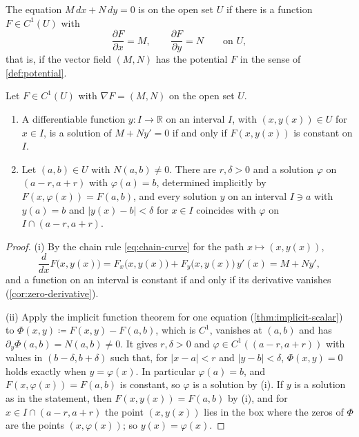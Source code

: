 \begin{definition}
\label{def:exact}
The equation $M\,dx+N\,dy=0$ is  on the open set $U$ if there is a function $F\in C^1(U)$ with
\[
\frac{\partial F}{\partial x}=M,\qquad\frac{\partial F}{\partial y}=N\qquad\text{on }U ,
\]
that is, if the vector field $(M,N)$ has the potential $F$ in the sense of \cref{def:potential}.
\end{definition}

\begin{theorem}
\label{thm:exact-solutions}
Let $F\in C^1(U)$ with $\nabla F=(M,N)$ on the open set $U$.
\begin{enumerate}
\item A differentiable function $y\colon I\to\mathbb R$ on an interval $I$, with $(x,y(x))\in U$ for $x\in I$, is a solution of $M+Ny'=0$ if and only if $F(x,y(x))$ is constant on $I$.
\item Let $(a,b)\in U$ with $N(a,b)\ne0$. There are $r,\delta>0$ and a solution $\varphi$ on $(a-r,a+r)$ with $\varphi(a)=b$, determined implicitly by $F(x,\varphi(x))=F(a,b)$, and every solution $y$ on an interval $I\ni a$ with $y(a)=b$ and $|y(x)-b|<\delta$ for $x\in I$ coincides with $\varphi$ on $I\cap(a-r,a+r)$.
\end{enumerate}
\end{theorem}

\begin{proof}
(i) By the chain rule \eqref{eq:chain-curve} for the path $x\mapsto(x,y(x))$,
\[
\frac d{dx}F\bigl(x,y(x)\bigr)=F_x\bigl(x,y(x)\bigr)+F_y\bigl(x,y(x)\bigr)\,y'(x)=M+Ny' ,
\]
and a function on an interval is constant if and only if its derivative vanishes (\cref{cor:zero-derivative}).

(ii) Apply the implicit function theorem for one equation (\cref{thm:implicit-scalar}) to $\Phi(x,y)\coloneqq F(x,y)-F(a,b)$, which is $C^1$, vanishes at $(a,b)$ and has $\partial_y\Phi(a,b)=N(a,b)\ne0$. It gives $r,\delta>0$ and $\varphi\in C^1((a-r,a+r))$ with values in $(b-\delta,b+\delta)$ such that, for $|x-a|<r$ and $|y-b|<\delta$, $\Phi(x,y)=0$ holds exactly when $y=\varphi(x)$. In particular $\varphi(a)=b$, and $F(x,\varphi(x))=F(a,b)$ is constant, so $\varphi$ is a solution by (i). If $y$ is a solution as in the statement, then $F(x,y(x))=F(a,b)$ by (i), and for $x\in I\cap(a-r,a+r)$ the point $(x,y(x))$ lies in the box where the zeros of $\Phi$ are the points $(x,\varphi(x))$; so $y(x)=\varphi(x)$.
\end{proof}

